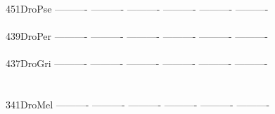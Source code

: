 \documentclass[11pt,twoside,reqno,a4paper]{article}
\begin{document}
{451\hspace*{1\charwidth}DroPse	----------	----------	----------	----------	----------	----------	\\
\hspace*{4\charwidth}\hspace*{7\charwidth}\hspace*{1\charwidth}\hspace*{1\charwidth}\hspace*{1\charwidth}\hspace*{1\charwidth}\hspace*{1\charwidth}\hspace*{1\charwidth}\\
439\hspace*{1\charwidth}DroPer	----------	----------	----------	----------	----------	----------	\\
\hspace*{4\charwidth}\hspace*{7\charwidth}\hspace*{1\charwidth}\hspace*{1\charwidth}\hspace*{1\charwidth}\hspace*{1\charwidth}\hspace*{1\charwidth}\hspace*{1\charwidth}\\
437\hspace*{1\charwidth}DroGri	----------	----------	----------	----------	----------	----------	\\
\hspace*{4\charwidth}\hspace*{7\charwidth}\hspace*{1\charwidth}\hspace*{1\charwidth}\hspace*{1\charwidth}\hspace*{1\charwidth}\hspace*{1\charwidth}\hspace*{1\charwidth}\\
\\
341\hspace*{1\charwidth}DroMel	----------	----------	----------	----------	----------	----------	\\
\hspace*{4\charwidth}\hspace*{7\charwidth}\hspace*{1\charwidth}\hspace*{1\charwidth}\hspace*{1\charwidth}\hspace*{1\charwidth}\hspace*{1\charwidth}\hspace*{1\charwidth}\\
}
\end{document}

